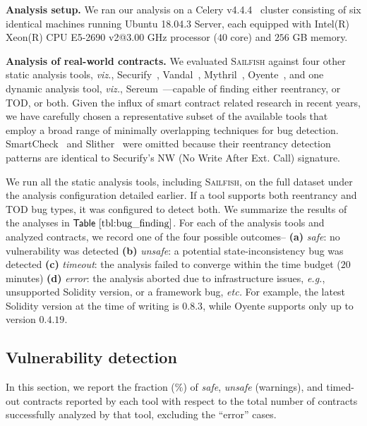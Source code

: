 \documentclass[conference, romanappendices]{tex/IEEEtran}
\theoremstyle{bfnote}
\newcommand{\toolname}{\textsc{Sailfish}\xspace}
\newcommand{\oyente}{{\sc Oyente}\xspace}
\newcommand{\securify}{{\sc Securify}\xspace}
\newcommand{\sereum}{{\sc Sereum}\xspace}
\newcommand{\slither}{{\sc Slither}\xspace}
\newcommand{\smartcheck}{{\sc SmartCheck}\xspace}
\newcommand{\vandal}{{\sc Vandal}\xspace}
\newcommand{\solidity}{{\sc Solidity}\xspace}
\newcommand{\smart}{smart contract}
\newcommand{\reentrancy}{{reentrancy}\xspace}
\newcommand{\si}{{state-inconsistency}\xspace}
\newcommand{\mythril}{{\sc Mythril}\xspace}
\newcommand{\etc}{\textit{etc.}}
\newcommand{\eg}{\textit{e.g.}}
\newcommand{\viz}{\textit{viz.}}
\newcommand{\Tbl}[1]{\ensuremath{\sf Table~\ref{#1}}}
\newcommand{\timeBudget}{20}
\begin{document}
\noindent
\textbf{Analysis setup.}
We ran our analysis on a Celery v4.4.4~\cite{celery} cluster consisting of six identical machines running Ubuntu 18.04.3 Server, each equipped with Intel(R) Xeon(R) CPU E5-2690 v2@3.00 GHz processor ($40$ core) and $256$ GB memory.

\noindent
\textbf{Analysis of real-world contracts.}
We evaluated \toolname{} against four other static analysis tools, \viz,  \securify~\cite{securify}, \vandal~\cite{vandal}, \mythril~\cite{mythril}, \oyente~\cite{oyente}, and one dynamic analysis tool, \viz, \sereum~\cite{sereum}---capable of finding either \reentrancy, or TOD, or both.
Given the influx of \smart{} related research in recent years, we have carefully chosen a representative subset of the available tools that employ a broad range of minimally overlapping techniques for bug detection.
\smartcheck~\cite{smartcheck} and \slither~\cite{slither} were omitted because their reentrancy detection patterns are identical to \securify's NW (No Write After Ext. Call) signature.

We run all the static analysis tools, including \toolname, on the full dataset under the analysis configuration detailed earlier.
If a tool supports both \reentrancy and TOD bug types, it was configured to detect both.
We summarize the results of the analyses in \Tbl{tbl:bug_finding}.
For each of the analysis tools and analyzed contracts, we record one of the four possible outcomes--
\textbf{(a)} \textit{safe}: no vulnerability was detected 
\textbf{(b)} \textit{unsafe}: a potential \si bug was detected
\textbf{(c)} \textit{timeout}: the analysis failed to converge within the time budget ($\timeBudget$ minutes)
\textbf{(d)} \textit{error}: the analysis aborted due to infrastructure issues, \eg, unsupported \solidity{} version, or a framework bug, \etc{}
For example, the latest \solidity{} version at the time of writing is $0.8.3$, while \oyente{} supports only up to version $0.4.19$.

\subsection{Vulnerability detection}
\label{sec:vulnerability_detection}
In this section, we report the fraction ($\%$) of \emph{safe}, \emph{unsafe} (warnings), and timed-out contracts reported by each tool with respect to the total number of contracts successfully analyzed by that tool, excluding the ``error'' cases.
\end{document}
